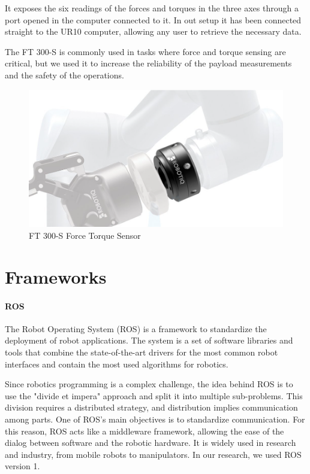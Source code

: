 It exposes the six readings of the forces and torques in the three axes through a port opened in the computer connected to it. In out setup it has been connected straight to the UR10 computer, allowing any user to retrieve the necessary data.  

The FT 300-S is commonly used in tasks where force and torque sensing are critical, but we used it to increase the reliability of the payload measurements and the safety of the operations. 

\begin{figure}
	\centering
	\includegraphics[width=0.9\linewidth]{Images/ft_sensor.png}
	\caption{FT 300-S Force Torque Sensor}
	\label{fig:ft-sensor}
\end{figure}

\newpage
\section{Frameworks}
\paragraph{ROS}
The Robot Operating System (ROS) \cite{url:ros} is a framework to standardize the deployment of robot applications. The system is a set of software libraries and tools that combine the state-of-the-art drivers for the most common robot interfaces and contain the most used algorithms for robotics. 

Since robotics programming is a complex challenge, the idea behind ROS is to use the "divide et impera" approach and split it into multiple sub-problems. This division requires a distributed strategy, and distribution implies communication among parts. One of ROS's main objectives is to standardize communication. For this reason, ROS acts like a middleware framework, allowing the ease of the dialog between software and the robotic hardware. It is widely used in research and industry, from mobile robots to manipulators. In our research, we used ROS version 1. 

